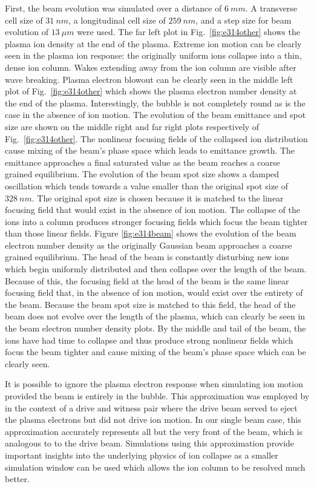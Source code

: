 \documentclass{aac}
\begin{document}
First, the beam evolution was simulated over a distance of $\SI{6}{mm}$. A transverse cell size of $\SI{31}{nm}$, a longitudinal cell size of $\SI{259}{nm}$, and a step size for beam evolution of $\SI{13}{\mu m}$ were used. The far left plot in Fig.~\ref{fig:e314other} shows the plasma ion density at the end of the plasma. Extreme ion motion can be clearly seen in the plasma ion response: the originally uniform ions collapse into a thin, dense ion column. Wakes extending away from the ion column are visible after wave breaking. Plasma electron blowout can be clearly seen in the middle left plot of Fig.~\ref{fig:e314other} which shows the plasma electron number density at the end of the plasma. Interestingly, the bubble is not completely round as is the case in the absence of ion motion. The evolution of the beam emittance and spot size are shown on the middle right and far right plots respectively of Fig.~\ref{fig:e314other}. The nonlinear focusing fields of the collapsed ion distribution cause mixing of the beam's phase space which leads to emittance growth. The emittance approaches a final saturated value as the beam reaches a coarse grained equilibrium. The evolution of the beam spot size shows a damped oscillation which tends towards a value smaller than the original spot size of $\SI{328}{nm}$. The original spot size is chosen because it is matched to the linear focusing field that would exist in the absence of ion motion. The collapse of the ions into a column produces stronger focusing fields which focus the beam tighter than those linear fields. Figure \ref{fig:e314beam} shows the evolution of the beam electron number density as the originally Gaussian beam approaches a coarse grained equilibrium. The head of the beam is constantly disturbing new ions which begin uniformly distributed and then collapse over the length of the beam. Because of this, the focusing field at the head of the beam is the same linear focusing field that, in the absence of ion motion, would exist over the entirety of the beam. Because the beam spot size is matched to this field, the head of the beam does not evolve over the length of the plasma, which can clearly be seen in the beam electron number density plots. By the middle and tail of the beam, the ions have had time to collapse and thus produce strong nonlinear fields which focus the beam tighter and cause mixing of the beam's phase space which can be clearly seen.

It is possible to ignore the plasma electron response when simulating ion motion provided the beam is entirely in the bubble. This approximation was employed by \cite{an} in the context of a drive and witness pair where the drive beam served to eject the plasma electrons but did not drive ion motion. In our single beam case, this approximation accurately represents all but the very front of the beam, which is analogous to to the drive beam. Simulations using this approximation provide important insights into the underlying physics of ion collapse as a smaller simulation window can be used which allows the ion column to be resolved much better. 
\end{document}
